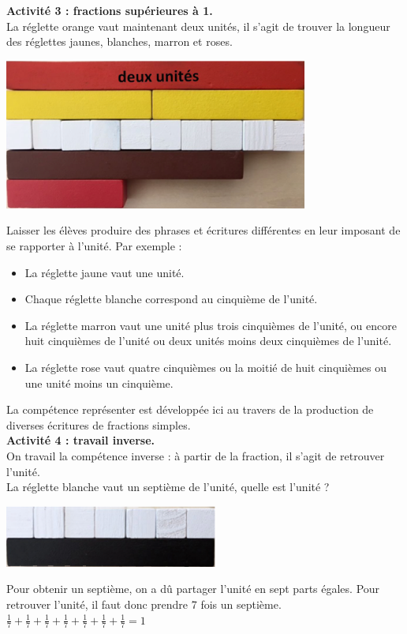 \begin{exercice*}
{\bf Activité 3 : fractions supérieures à 1.} \\
   La réglette orange vaut maintenant deux unités, il s'agit de trouver la longueur des réglettes jaunes, blanches, marron et roses.
   \begin{center}
         \includegraphics[width=10cm]{Nombres_et_calculs_did/Images/Num4_activites_Cuisenaire_A3}
   \end{center}
   Laisser les élèves produire des phrases et écritures différentes en leur imposant de se rapporter à l'unité. Par exemple :
   \begin{itemize}
      \item La réglette jaune vaut une unité.
      \item Chaque réglette blanche correspond au cinquième de l’unité.
      \item La réglette marron vaut une unité plus trois cinquièmes de l’unité, ou encore huit cinquièmes de l’unité ou deux unités moins deux cinquièmes de l’unité.
      \item La réglette rose vaut quatre cinquièmes ou la moitié de huit cinquièmes ou une unité moins un cinquième.
   \end{itemize}
La compétence \og représenter \fg{} est développée ici au travers de la production de diverses écritures de fractions simples. \\

{\bf Activité 4 : travail inverse.} \\
   On travail la compétence inverse : à partir de la fraction, il s'agit de retrouver l'unité. \\ [2mm] 
   La réglette blanche vaut un septième de l’unité, quelle est l’unité ? \\ [2mm]
   \begin{minipage}{7cm}
      \includegraphics[width=7cm]{Nombres_et_calculs_did/Images/Num4_activites_Cuisenaire_A4}
   \end{minipage}
   \qquad
   \begin{minipage}{9cm}
      Pour obtenir un septième, on a dû partager l’unité en sept parts égales. Pour retrouver l’unité, il faut donc prendre 7 fois un septième. \\ [1mm]
      $\frac17+\frac17+\frac17+\frac17+\frac17+\frac17+\frac17 =1$ 
   \end{minipage}
   

\end{exercice*}
